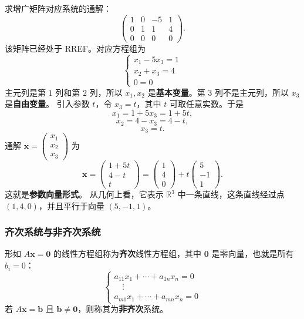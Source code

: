 \begin{example}[无穷多解]
求增广矩阵对应系统的通解：
\[
\left(\begin{array}{ccc|c}
1&0&-5&1\\
0&1&1&4\\
0&0&0&0
\end{array}\right).
\]
该矩阵已经处于 RREF。对应方程组为
\[
\begin{cases}
x_1-5x_3=1\\
x_2+x_3=4\\
0=0
\end{cases}
\]
主元列是第 $1$ 列和第 $2$ 列，所以 $x_1,x_2$ 是\textbf{基本变量}。第 $3$ 列不是主元列，所以 $x_3$ 是\textbf{自由变量}。
引入参数 $t$，令 $x_3=t$，其中 $t$ 可取任意实数。于是
\[ x_1=1+5x_3=1+5t, \]
\[ x_2=4-x_3=4-t, \]
\[ x_3=t. \]
通解 $\mathbf{x}=\begin{pmatrix}x_1\\x_2\\x_3\end{pmatrix}$ 为
\[ \mathbf{x}=\begin{pmatrix}1+5t\\4-t\\t\end{pmatrix}=\begin{pmatrix}1\\4\\0\end{pmatrix}+t\begin{pmatrix}5\\-1\\1\end{pmatrix}. \]
这就是\textbf{参数向量形式}。
从几何上看，它表示 $\mathbb{R}^3$ 中一条直线，这条直线经过点 $(1,4,0)$，并且平行于向量 $(5,-1,1)$。
\end{example}

\subsubsection{齐次系统与非齐次系统}

\begin{definition}
形如 $A\mathbf{x}=\mathbf{0}$ 的线性方程组称为\textbf{齐次}线性方程组，其中 $\mathbf{0}$ 是零向量，也就是所有 $b_i=0$：
\[
\begin{cases}
a_{11}x_1+\cdots+a_{1n}x_n=0\\
\quad\vdots\\
a_{m1}x_1+\cdots+a_{mn}x_n=0
\end{cases}
\]
若 $A\mathbf{x}=\mathbf{b}$ 且 $\mathbf{b}\neq\mathbf{0}$，则称其为\textbf{非齐次}系统。
\end{definition}

